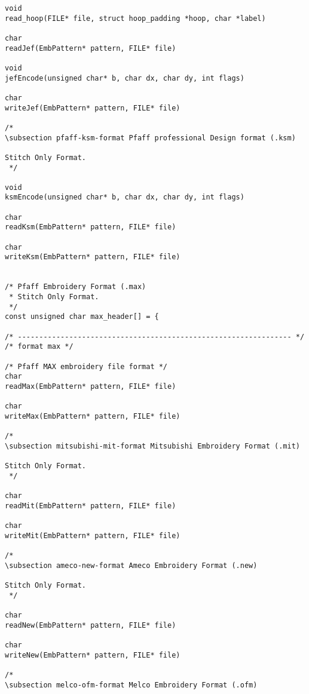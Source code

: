\begin{lstlisting}
void
read_hoop(FILE* file, struct hoop_padding *hoop, char *label)

char
readJef(EmbPattern* pattern, FILE* file)

void
jefEncode(unsigned char* b, char dx, char dy, int flags)

char
writeJef(EmbPattern* pattern, FILE* file)

/*
\subsection pfaff-ksm-format Pfaff professional Design format (.ksm)

Stitch Only Format.
 */

void
ksmEncode(unsigned char* b, char dx, char dy, int flags)

char
readKsm(EmbPattern* pattern, FILE* file)

char
writeKsm(EmbPattern* pattern, FILE* file)


/* Pfaff Embroidery Format (.max)
 * Stitch Only Format.
 */
const unsigned char max_header[] = {

/* ---------------------------------------------------------------- */
/* format max */

/* Pfaff MAX embroidery file format */
char
readMax(EmbPattern* pattern, FILE* file)

char
writeMax(EmbPattern* pattern, FILE* file)

/*
\subsection mitsubishi-mit-format Mitsubishi Embroidery Format (.mit)

Stitch Only Format.
 */

char
readMit(EmbPattern* pattern, FILE* file)

char
writeMit(EmbPattern* pattern, FILE* file)

/*
\subsection ameco-new-format Ameco Embroidery Format (.new)

Stitch Only Format.
 */

char
readNew(EmbPattern* pattern, FILE* file)

char
writeNew(EmbPattern* pattern, FILE* file)

/*
\subsection melco-ofm-format Melco Embroidery Format (.ofm)


\end{lstlisting}
